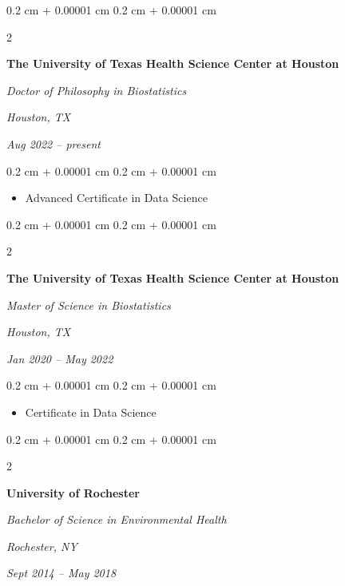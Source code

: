 \documentclass[10pt, letterpaper]{article}
\newenvironment{highlights}{
    \begin{itemize}[
        topsep=0.10 cm,
        parsep=0.10 cm,
        partopsep=0pt,
        itemsep=0pt,
        leftmargin=0.4 cm + 10pt
    ]
}{
    \end{itemize}
} %
\newenvironment{onecolentry}{
    \begin{adjustwidth}{
        0.2 cm + 0.00001 cm
    }{
        0.2 cm + 0.00001 cm
    }
}{
    \end{adjustwidth}
} %
\newenvironment{twocolentry}[2][]{
    \onecolentry
    \def\secondColumn{#2}
    \setcolumnwidth{\fill, 4.5 cm}
    \begin{paracol}{2}
}{
    \switchcolumn \raggedleft \secondColumn
    \end{paracol}
    \endonecolentry
} %
\begin{document}
        \vspace{0.2 cm}

        \begin{twocolentry}{
        \textit{Houston, TX}    
            
        \textit{Aug 2022 – present}}
            \textbf{The University of Texas Health Science Center at Houston}

            \textit{Doctor of Philosophy in Biostatistics}
        \end{twocolentry}

        \vspace{0.10 cm}
        \begin{onecolentry}
            \begin{highlights}
                \item Advanced Certificate in Data Science
            \end{highlights}
        \end{onecolentry}


        \vspace{0.2 cm}

        \begin{twocolentry}{
        \textit{Houston, TX}    
            
        \textit{Jan 2020 – May 2022}}
            \textbf{The University of Texas Health Science Center at Houston}

            \textit{Master of Science in Biostatistics}
        \end{twocolentry}

        \vspace{0.10 cm}
        \begin{onecolentry}
            \begin{highlights}
                \item Certificate in Data Science
            \end{highlights}
        \end{onecolentry}


        \vspace{0.2 cm}

        \begin{twocolentry}{
        \textit{Rochester, NY}    
            
        \textit{Sept 2014 – May 2018}}
            \textbf{University of Rochester}

            \textit{Bachelor of Science in Environmental Health}
        \end{twocolentry}
\end{document}
